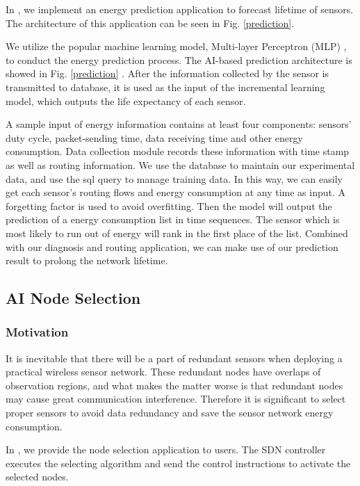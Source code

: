 In {\sdn},  we implement an energy prediction application 
to forecast lifetime of sensors. The architecture of this application
can be seen in Fig. \ref{prediction}.


We utilize the popular machine learning model, 
Multi-layer Perceptron (MLP) \cite{Harvey1988An},
to conduct the energy prediction process. 
The AI-based prediction architecture is  showed in Fig. \ref{prediction} .
After the information collected by the sensor is transmitted to database, it is used as
the input of the incremental learning model, which outputs the
life expectancy of each sensor. 

A sample input of energy information contains at least four components: sensors'
duty cycle, packet-sending time, data receiving time and other energy
consumption. Data collection module records these information with time stamp
as well as routing information. We use the database to maintain our experimental data,
and use the sql query to manage training data. In this way, we can easily
get each sensor's routing flows and energy consumption at any time as input. A forgetting factor
is used to avoid overfitting. Then the model will output the prediction of a energy consumption list in time
sequences. The sensor which is most likely to run out of energy will rank in the first place of the list. 
Combined with our diagnosis and routing application, we can make use of our prediction result to prolong the network
lifetime.





\subsection{AI Node Selection}

\subsubsection{Motivation}

It is inevitable that there will be a part of redundant sensors when deploying a 
practical wireless sensor network. These redundant nodes have overlaps of
observation regions, and what makes the matter worse is that redundant nodes
may cause great communication interference. Therefore it is significant to select 
proper sensors to avoid data redundancy and save the sensor network energy consumption.

In {\sdn}, we provide the node selection application to users. The SDN controller executes the 
selecting algorithm and send the control instructions to activate the selected nodes.

